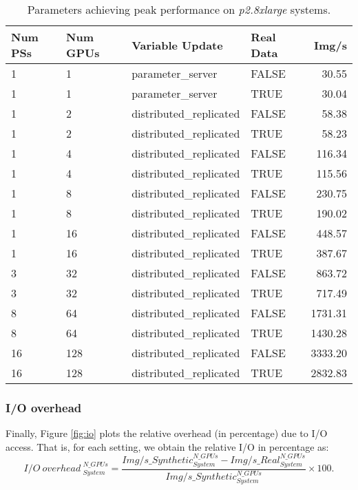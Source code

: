 \begin{table}[H]
 \centering
 \begin{tabular}{||l | l | l | l | r||} 
 \hline
 \textbf{Num PSs} & \textbf{Num GPUs} & \textbf{Variable Update} & \textbf{Real Data} & \textbf{Img/s}\\ [0.5ex]  
 \hline\hline
 1 & 1 & parameter\_server & FALSE & 30.55\\\hline
 1 & 1 & parameter\_server & TRUE & 30.04\\\hline
 1 & 2 & distributed\_replicated & FALSE & 58.38\\\hline
 1 & 2 & distributed\_replicated & TRUE & 58.23\\\hline
 1 & 4 & distributed\_replicated & FALSE & 116.34\\\hline
 1 & 4 & distributed\_replicated & TRUE & 115.56\\\hline
 1 & 8 & distributed\_replicated & FALSE & 230.75\\\hline
 1 & 8 & distributed\_replicated & TRUE & 190.02\\\hline
 1 & 16 & distributed\_replicated & FALSE & 448.57\\\hline
 1 & 16 & distributed\_replicated & TRUE & 387.67\\\hline
 3 & 32 & distributed\_replicated & FALSE & 863.72\\\hline
 3 & 32 & distributed\_replicated & TRUE & 717.49\\\hline
 8 & 64 & distributed\_replicated & FALSE & 1731.31\\\hline
 8 & 64 & distributed\_replicated & TRUE & 1430.28\\\hline
 16 & 128 & distributed\_replicated & FALSE & 3333.20\\\hline
 16 & 128 & distributed\_replicated & TRUE & 2832.83\\\hline
\end{tabular}
\caption{Parameters achieving peak performance on \textit{p2.8xlarge} systems.}
\label{tab:peak-perf-p28}
\end{table}

\subsubsection{I/O overhead}
Finally, Figure \ref{fig:io} plots the relative overhead (in percentage) due to I/O access.
That is, for each setting, we obtain the relative I/O in percentage as:
$$I/O~overhead~_{System}^{N\_GPUs} = \dfrac{Img/s\_Synthetic_{System}^{N\_GPUs} - Img/s\_Real_{System}^{N\_GPUs}}{Img/s\_Synthetic_{System}^{N\_GPUs}} \times 100.$$

